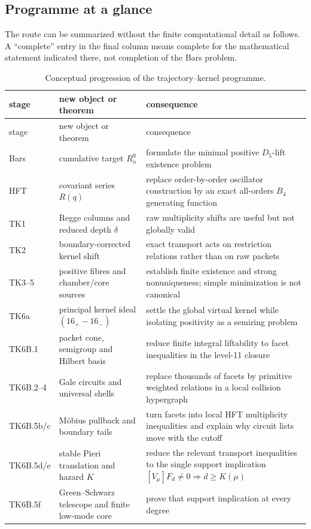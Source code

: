 \documentclass[11pt,a4paper]{article}
\theoremstyle{definition}
\begin{document}
\subsection{Programme at a glance}

The route can be summarized without the finite computational detail as
follows.  A ``complete'' entry in the final column means complete for the
mathematical statement indicated there, not completion of the Bars problem.

\begin{longtable}{p{}p{}p{}}
\caption{Conceptual progression of the trajectory--kernel programme.}
\label{tab:programme-roadmap}\\
\toprule
stage & new object or theorem & consequence \\
\midrule
\endfirsthead
\toprule
stage & new object or theorem & consequence \\
\midrule
\endhead
Bars & cumulative target $R_n^9$ & formulate the minimal positive
$D_5$-lift existence problem \\
HFT & covariant series $R(q)$ & replace order-by-order oscillator
construction by an exact all-orders $B_4$ generating function \\
TK1 & Regge columns and reduced depth $\delta$ & raw multiplicity shifts are
useful but not globally valid \\
TK2 & boundary-corrected kernel shift & exact transport acts on restriction
relations rather than on raw packets \\
TK3--5 & positive fibres and chamber/core sources & establish finite
existence and strong nonuniqueness; simple minimization is not canonical \\
TK6a & principal kernel ideal $(16_+-16_-)$ & settle the global virtual
kernel while isolating positivity as a semiring problem \\
TK6B.1 & packet cone, semigroup and Hilbert basis & reduce finite integral
liftability to facet inequalities in the level-11 closure \\
TK6B.2--4 & Gale circuits and universal shells & replace thousands of facets
by primitive weighted relations in a local collision hypergraph \\
TK6B.5b/c & M\"obius pullback and boundary tails & turn facets into local HFT
multiplicity inequalities and explain why circuit lists move with the cutoff
\\
TK6B.5d/e & stable Pieri translation and hazard $K$ & reduce the relevant
transport inequalities to the single support implication
$[V_\mu]F_d\neq0\Rightarrow d\geq K(\mu)$ \\
TK6B.5f & Green--Schwarz telescope and finite low-mode core & prove that
support implication at every degree \\
\bottomrule
\end{longtable}
\end{document}
